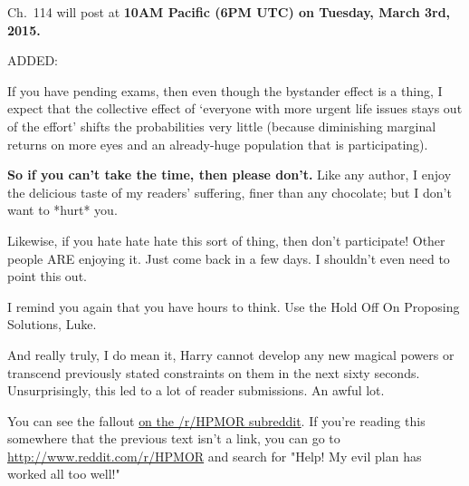 \vspace*{.5\baselineskip}\noindent
Ch.~114 will post at \textbf{10AM Pacific (6PM UTC) on Tuesday, March
3rd, 2015.}

\vspace*{.5\baselineskip}\noindent
ADDED:

\vspace*{.5\baselineskip}\noindent
If you have pending exams,
then even though the bystander effect is a thing,
I expect that the collective effect of
`everyone with more urgent life issues stays out of the effort'
shifts the probabilities very little
(because diminishing marginal returns on more eyes
and an already-huge population that is participating).

\vspace*{.5\baselineskip}\noindent
\textbf{So if you can't take the time, then please don't.}
Like any author, I enjoy the delicious taste of my readers' suffering,
finer than any chocolate; but I don't want to *hurt* you.

\vspace*{.5\baselineskip}\noindent
Likewise, if you hate hate hate this sort of thing, then don't
participate!
Other people ARE enjoying it. Just come back in a few days.
I shouldn't even need to point this out.

\vspace*{.5\baselineskip}\noindent
I remind you again that you have hours to think.
Use the Hold Off On Proposing Solutions, Luke.

\vspace*{.5\baselineskip}\noindent
And really truly, I do mean it,
Harry cannot develop any new magical powers
or transcend previously stated constraints on them
in the next sixty seconds.
\sbreak
Unsurprisingly, this led to a lot of reader submissions. An awful lot.

You can see the
fallout \href{http://www.reddit.com/r/HPMOR/comments/2xnyi0/113_help_my_evil_plan_has_worked_all_too_well/}{on the /r/HPMOR subreddit}. 
If you're reading this somewhere that the previous text isn't a link, you 
can go to \url{http://www.reddit.com/r/HPMOR} and search for "Help! My evil plan has worked all too well!"
